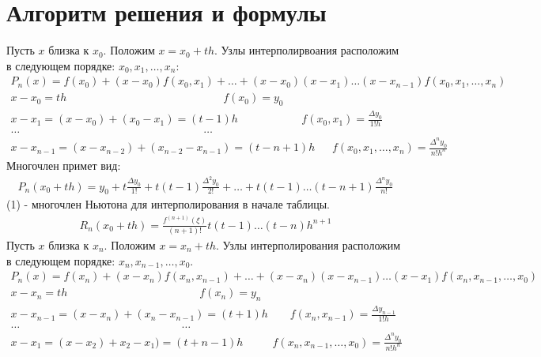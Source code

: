 \documentclass[10pt]{scrartcl}
\begin{document}
\section*{Алгоритм решения и формулы}\noindent
Пусть $x$ близка к $x_0$. Положим $x = x_0 + th$. Узлы интерполирвоания расположим в следующем порядке: $x_0, x_1, \dots, x_n$:
\begin{gather*}
P_n(x) = f(x_0) + (x - x_0)f(x_0, x_1) + \dots + (x - x_0)(x - x_1)\dots(x - x_{n - 1})
f(x_0, x_1, \dots, x_n)\\
x - x_0 = th \ \ \ \ \ \ \ \ \ \ \ \ \ \ \ \ \ \ \ \ \ \ \ \ \ \ \ \ \ \ \ \ \ \ \ \ \ 
\ \ \ \ \ \ \ \ \ \ \ \ \ \ \ \ \ \ \ \ \ \ \ \ \ \ \ f(x_0) = y_0\\
x - x_1 = (x - x_0) + (x_0 - x_1) = (t - 1)h \ \ \ \ \ \ \ \ \ \ \ \ \ \ \ \ \ \ \ \ \ 
\ \ \ \ \ f(x_0, x_1) = \frac{\Delta y_0}{1!h}\\
\dots \ \ \ \ \ \ \ \ \ \ \ \ \ \ \ \ \ \ \ \ \ \ \ \ \ \ \ \ \ \ \ \ \ \ \ \ \ \ \ \ 
\ \ \ \ \ \ \ \ \ \ \ \ \ \ \ \ \ \ \ \ \ \ \ \ \ \ \ \ \ \ \ \ \ \ \ \dots\\
x - x_{n - 1} = (x - x_{n - 2}) + (x_{n - 2} - x_{n - 1}) = (t - n + 1)h \ \ \ \ \ \ \ 
f(x_0, x_1, \dots, x_n) = \frac{\Delta^n y_0}{n!h^n}
\end{gather*}
Многочлен примет вид:
\begin{gather}
P_n(x_0 + th) = y_0 + t\frac{\Delta y_0}{1!} + t(t - 1)\frac{\Delta^2 y_0}{2!} + \dots +
t(t - 1)\dots(t - n + 1)\frac{\Delta^n y_0}{n!}
\end{gather}
(1) - многочлен Ньютона для интерполирования в начале таблицы.
\begin{gather*}
R_n(x_0 + th) = \frac{f^{(n + 1)}(\xi)}{(n + 1)!}t(t - 1)\dots(t - n)h^{n + 1}
\end{gather*}
Пусть $x$ близка к $x_n$. Положим $x = x_n + th$. Узлы интерполирования расположим в 
следующем порядке: $x_n, x_{n - 1}, \dots, x_0$.
\begin{gather*}
P_n(x) = f(x_n) + (x - x_n)f(x_n, x_{n - 1}) + \dots + (x - x_n)(x - x_{n - 1})\dots(x - x_1)
f(x_n, x_{n - 1}, \dots, x_0)\\
x - x_n = th \ \ \ \ \ \ \ \ \ \ \ \ \ \ \ \ \ \ \ \ \ \ \ \ \ \ \ \ \ \ \ \ 
\ \ \ \ \ \ \ \ \ \ \ \ \ \ \ \ \ \ \ \ \ \ f(x_n) = y_n\\
x - x_{n - 1} = (x - x_n) + (x_n - x_{n - 1}) = (t + 1)h \ \ \ \ \ \ \ \ \ 
f(x_n, x_{n - 1}) = \frac{\Delta y_{n - 1}}{1!h}\\
\dots \ \ \ \ \ \ \ \ \ \ \ \ \ \ \ \ \ \ \ \ \ \ \ \ \ \ \ \ \ \ \ \ \ \ \ \ \ \ \ \ 
\ \ \ \ \ \ \ \ \ \ \ \ \ \ \ \ \ \ \ \ \ \ \ \ \ \ \dots\\
x - x_1 = (x - x_2) + x_2 - x_1) = (t + n - 1)h \ \ \ \ \ \ \ \ \ \ \ \
f(x_n, x_{n - 1}, \dots, x_0) = \frac{\Delta^n y_0}{n!h^n}
\end{gather*}
\end{document}
